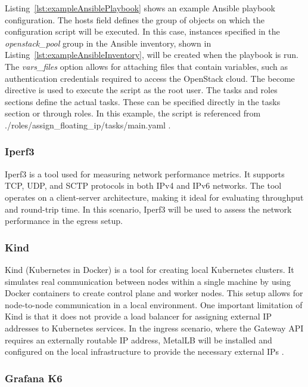 Listing~\ref{lst:exampleAnsiblePlaybook} shows an example Ansible playbook configuration. The hosts field defines the group of objects on which the configuration script will be executed. In this case, instances specified in the \textit{openstack\_pool} group in the Ansible inventory, shown in Listing~\ref{lst:exampleAnsibleInventory}, will be created when the playbook is run. The \textit{vars\_files} option allows for attaching files that contain variables, such as authentication credentials required to access the OpenStack cloud. The become directive is used to execute the script as the root user. The tasks and roles sections define the actual tasks. These can be specified directly in the tasks section or through roles. In this example, the script is referenced from ./roles/assign\_floating\_ip/tasks/main.yaml \cite{AnsibleDocs}.


\subsubsection{Iperf3}
\label{sec:iperf3}

Iperf3 is a tool used for measuring network performance metrics. It supports TCP, UDP, and SCTP protocols in both IPv4 and IPv6 networks. The tool operates on a client-server architecture, making it ideal for evaluating throughput and round-trip time. In this scenario, Iperf3 will be used to assess the network performance in the egress setup.

\subsubsection{Kind}
\label{sec:kind}

Kind (Kubernetes in Docker) is a tool for creating local Kubernetes clusters. It simulates real communication between nodes within a single machine by using Docker containers to create control plane and worker nodes. This setup allows for node-to-node communication in a local environment. One important limitation of Kind is that it does not provide a load balancer for assigning external IP addresses to Kubernetes services. In the ingress scenario, where the Gateway API requires an externally routable IP address, MetalLB will be installed and configured on the local infrastructure to provide the necessary external IPs \cite{Kind}.

\subsubsection{Grafana K6}
\label{sec:grafana}

